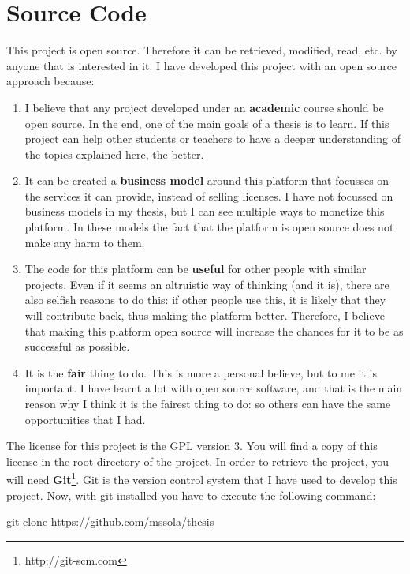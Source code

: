 
\section{Source Code}

This project is open source. Therefore it can be retrieved, modified, read,
etc. by anyone that is interested in it. I have developed this project with an
open source approach because:

\begin{enumerate}
  \itemsep0em
  \item I believe that any project developed under an {\bf academic} course
should be open source. In the end, one of the main goals of a thesis is to
learn. If this project can help other students or teachers to have a deeper
understanding of the topics explained here, the better.
  \item It can be created a {\bf business model} around this platform that
focusses on the services it can provide, instead of selling licenses. I have
not focussed on business models in my thesis, but I can see multiple ways to
monetize this platform. In these models the fact that the platform is open
source does not make any harm to them.
  \item The code for this platform can be {\bf useful} for other people with
similar projects. Even if it seems an altruistic way of thinking (and
it is), there are also selfish reasons to do this: if other people use this, it
is likely that they will contribute back, thus making the platform better.
Therefore, I believe that making this platform open source will increase the
chances for it to be as successful as possible.
  \item It is the {\bf fair} thing to do. This is more a personal believe, but
to me it is important. I have learnt a lot with open source software, and that
is the main reason why I think it is the fairest thing to do: so others can
have the same opportunities that I had.
\end{enumerate}

The license for this project is the GPL version 3. You will find a copy of this
license in the root directory of the project. In order to retrieve the project,
you will need {\bf Git}\footnote{http://git-scm.com}. Git is the version
control system that I have used to develop this project. Now, with git
installed you have to execute the following command:

\begin{center}
  git clone https://github.com/mssola/thesis
\end{center}

